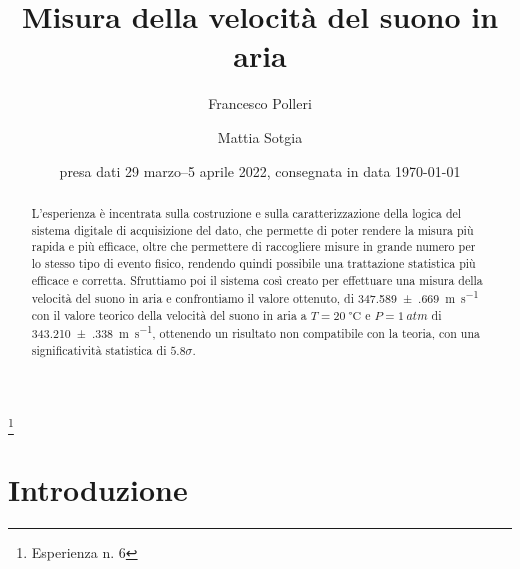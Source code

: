 \documentclass[
    rmp,
    reprint, 
    superscriptaddress, 
    altaffilletter, 
    amsmath, 
    amssymb, 
    a4paper,
    varvw]{revtex4-2}
\begin{document}
\title{Misura della velocità del suono in aria
}
\thanks{Esperienza n. 6
}

\author{Francesco Polleri}
\author{Mattia Sotgia}


\date{presa dati
    29 marzo--5 aprile 2022, consegnata in data 
    \today
}

\begin{abstract}
    L'esperienza è incentrata sulla costruzione e sulla caratterizzazione della logica del sistema digitale di acquisizione del dato, che permette di poter rendere la misura più rapida e più efficace, oltre che permettere di raccogliere misure in grande numero per lo stesso tipo di evento fisico, rendendo quindi possibile una trattazione statistica più efficace e corretta. Sfruttiamo poi il sistema così creato per effettuare una misura della velocità del suono in aria e confrontiamo il valore ottenuto, di \SI{347.589(669)}{\metre\per\second} con il valore teorico della velocità del suono in aria a $T=\SI{20}{\celsius}$ e $P=\SI{1}{atm}$ di \SI{343.210(338)}{\metre\per\second}, ottenendo un risultato non compatibile con la teoria, con una significatività statistica di $5.8\sigma$.
\end{abstract}

\maketitle
\thispagestyle{fancy}




\section{Introduzione}
\end{document}
